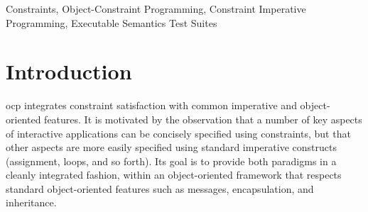 \documentclass[10pt,reprint]{sigplanconf-preprint}
\newcommand{\ac}[1]{\gls*{#1}}
\begin{document}
\begin{abstract}
  In this paper we present design principles that tame the power of
  the constraint solver in object-constraint languages to avoid
  difficult corner cases and surprising solutions while retaining the
  key features of the approach, including constraints over mutable
  objects, constraints involving object identity, and constraints on
  the results of message sends. We present our solution concretely in
  the context of the Babelsberg object-constraint language framework, providing
  both an informal description of
  the resulting language and a formal semantics for a core subset
  of it.  We validate the utility of this semantics with an executable
  version that allows us to run test programs and to verify that
  they provide the same results as existing implementations of
  Babelsberg in JavaScript, Ruby, and Smalltalk.
\end{abstract}



\keywords Constraints, Object-Constraint Programming, Constraint
Imperative Programming, Executable Semantics Test Suites

\def\sectionautorefname{Section}
\def\subsectionautorefname{Section}
\def\subsubsectionautorefname{Section}
\def\tableautorefname{Table}
\def\figureautorefname{Figure}

\setcounter{footnote}{0}

\section{Introduction}
\label{sec:introduction}

\ac{ocp} \cite{FelgentreffJOT14} integrates constraint satisfaction 
with common imperative and object-oriented features.  
It is motivated by the observation that a number of
key aspects of interactive applications can be concisely specified
using constraints, but that other aspects are more easily specified
using standard imperative constructs (assignment, loops, and so
forth).  Its goal is to provide both paradigms in a cleanly integrated
fashion, within an object-oriented framework that respects standard
object-oriented features such as messages, encapsulation, and
inheritance.
\end{document}
